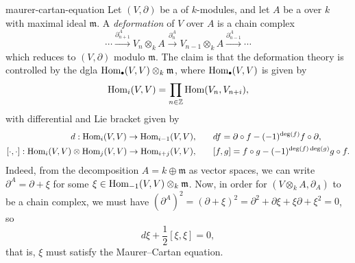 \begin{example}{maurer-cartan-equation}
    Let $(V, \partial)$ be a  of $k$-modules, and let $A$ be a   over $k$ with maximal ideal $\mathfrak{m}$. A \textit{deformation} of $V$ over $A$ is a chain complex
    \[ \cdots \xrightarrow{\partial^A_{n + 1}} V_n \otimes_k A \xrightarrow{\partial^A_n} V_{n - 1} \otimes_k A \xrightarrow{\partial^A_{n - 1}} \cdots \]
    which reduces to $(V, \partial)$ modulo $\mathfrak{m}$. The claim is that the deformation theory is controlled by the dgla $\Hom_\bdot(V, V) \otimes_k \mathfrak{m}$, where $\Hom_\bdot(V, V)$ is given by
    \[ \text{Hom}_i(V, V) = \prod_{n \in \mathbb{Z}} \text{Hom}(V_n, V_{n + i}) , \]
    with differential and Lie bracket given by
    \[ \begin{aligned}
        d : \text{Hom}_i(V, V) \to \text{Hom}_{i - 1}(V, V), &\qquad df = \partial \circ f - (-1)^{\deg(f)} f \circ \partial , \\
        [ \cdot, \cdot ] : \text{Hom}_i(V, V) \otimes \text{Hom}_j(V, V) \to \text{Hom}_{i + j}(V, V), &\qquad [f, g] = f \circ g - (-1)^{\deg(f) \deg(g)} g \circ f .
    \end{aligned} \]
    Indeed, from the decomposition $A = k \oplus \mathfrak{m}$ as vector spaces, we can write $\partial^A = \partial + \xi$ for some $\xi \in \text{Hom}_{-1}(V, V) \otimes_k \mathfrak{m}$. Now, in order for $(V \otimes_k A, \partial_A)$ to be a chain complex, we must have $(\partial^A)^2 = (\partial + \xi)^2 = \partial^2 + \partial \xi + \xi \partial + \xi^2 = 0$, so
    \[ d \xi + \frac{1}{2} [\xi, \xi] = 0 , \]
    that is, $\xi$ must satisfy the Maurer--Cartan equation.
\end{example}

